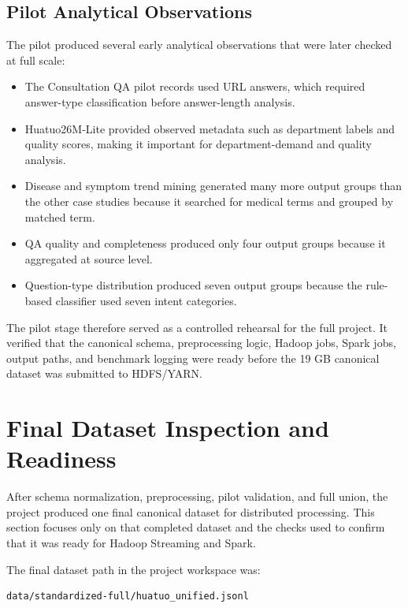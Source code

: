 \documentclass[12pt,a4paper]{article}
\let\oldsection\section
\renewcommand{\section}{\clearpage\oldsection}
\begin{document}
\subsection{Pilot Analytical Observations}

The pilot produced several early analytical observations that were later checked at full scale:

\begin{itemize}
\item The Consultation QA pilot records used URL answers, which required answer-type classification before answer-length analysis.
\item Huatuo26M-Lite provided observed metadata such as department labels and quality scores, making it important for department-demand and quality analysis.
\item Disease and symptom trend mining generated many more output groups than the other case studies because it searched for medical terms and grouped by matched term.
\item QA quality and completeness produced only four output groups because it aggregated at source level.
\item Question-type distribution produced seven output groups because the rule-based classifier used seven intent categories.
\end{itemize}

The pilot stage therefore served as a controlled rehearsal for the full project. It verified that the canonical schema, preprocessing logic, Hadoop jobs, Spark jobs, output paths, and benchmark logging were ready before the 19 GB canonical dataset was submitted to HDFS/YARN.

\section{Final Dataset Inspection and Readiness}

After schema normalization, preprocessing, pilot validation, and full union, the project produced one final canonical dataset for distributed processing. This section focuses only on that completed dataset and the checks used to confirm that it was ready for Hadoop Streaming and Spark.

The final dataset path in the project workspace was:

\begin{verbatim}
data/standardized-full/huatuo_unified.jsonl
\end{verbatim}
\end{document}
